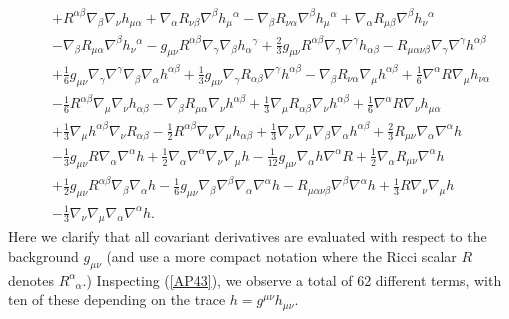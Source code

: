 \begin{eqnarray}
\nonumber\\
&&+ R^{\alpha \beta} \nabla_{\beta}\nabla_{\nu}h_{\mu \alpha} 
+ \nabla_{\alpha}R_{\nu \beta} \nabla^{\beta}h_{\mu}{}^{\alpha} 
-  \nabla_{\beta}R_{\nu \alpha} \nabla^{\beta}h_{\mu}{}^{\alpha} + \nabla_{\alpha}R_{\mu \beta} \nabla^{\beta}h_{\nu}{}^{\alpha} 
\nonumber\\
&&-  \nabla_{\beta}R_{\mu \alpha} \nabla^{\beta}h_{\nu}{}^{\alpha} -  g_{\mu \nu} R^{\alpha \beta} \nabla_{\gamma}\nabla_{\beta}h_{\alpha}{}^{\gamma} 
+ \tfrac{2}{3} g_{\mu \nu} R^{\alpha \beta} \nabla_{\gamma}\nabla^{\gamma}h_{\alpha \beta} 
-  R_{\mu \alpha \nu \beta} \nabla_{\gamma}\nabla^{\gamma}h^{\alpha \beta} 
\nonumber\\
&&+ \tfrac{1}{6} g_{\mu \nu} \nabla_{\gamma}\nabla^{\gamma}\nabla_{\beta}\nabla_{\alpha}h^{\alpha \beta} + \tfrac{1}{3} g_{\mu \nu} \nabla_{\gamma}R_{\alpha \beta} \nabla^{\gamma}h^{\alpha \beta} -  \nabla_{\beta}R_{\nu \alpha} \nabla_{\mu}h^{\alpha \beta} 
+ \tfrac{1}{6} \nabla^{\alpha}R \nabla_{\mu}h_{\nu \alpha} 
\nonumber\\
&&
-  \tfrac{1}{6} R^{\alpha \beta} \nabla_{\mu}\nabla_{\nu}h_{\alpha \beta} -  \nabla_{\beta}R_{\mu \alpha} \nabla_{\nu}h^{\alpha \beta} + \tfrac{1}{3} \nabla_{\mu}R_{\alpha \beta} \nabla_{\nu}h^{\alpha \beta} + \tfrac{1}{6} \nabla^{\alpha}R \nabla_{\nu}h_{\mu \alpha} 
\nonumber\\
&&+ \tfrac{1}{3} \nabla_{\mu}h^{\alpha \beta} \nabla_{\nu}R_{\alpha \beta} 
-  \tfrac{1}{2} R^{\alpha \beta} \nabla_{\nu}\nabla_{\mu}h_{\alpha \beta} 
+ \tfrac{1}{3} \nabla_{\nu}\nabla_{\mu}\nabla_{\beta}\nabla_{\alpha}h^{\alpha \beta}
+\tfrac{2}{3} R_{\mu \nu} \nabla_{\alpha}\nabla^{\alpha}h 
\nonumber\\
&&-  \tfrac{1}{3} g_{\mu \nu} R \nabla_{\alpha}\nabla^{\alpha}h + \tfrac{1}{2} \nabla_{\alpha}\nabla^{\alpha}\nabla_{\nu}\nabla_{\mu}h 
-  \tfrac{1}{12} g_{\mu \nu} \nabla_{\alpha}h \nabla^{\alpha}R + \tfrac{1}{2} \nabla_{\alpha}R_{\mu \nu} \nabla^{\alpha}h 
\nonumber\\
&&
+ \tfrac{1}{2} g_{\mu \nu} R^{\alpha \beta} \nabla_{\beta}\nabla_{\alpha}h -  \tfrac{1}{6} g_{\mu \nu} \nabla_{\beta}\nabla^{\beta}\nabla_{\alpha}\nabla^{\alpha}h -  R_{\mu \alpha \nu \beta} \nabla^{\beta}\nabla^{\alpha}h + \tfrac{1}{3} R \nabla_{\nu}\nabla_{\mu}h 
\nonumber\\
&&-  \tfrac{1}{3} \nabla_{\nu}\nabla_{\mu}\nabla_{\alpha}\nabla^{\alpha}h.
\label{AP43}
\end{eqnarray}
%
Here we clarify that all covariant derivatives are evaluated with respect to the background $g_{\mu\nu}$ (and use a more compact notation where the Ricci scalar $R$ denotes $R^{\alpha}_{\phantom{\alpha}\alpha}$.) Inspecting (\ref{AP43}), we observe a total of 62 different terms, with ten of these depending on the trace $h=g^{\mu\nu}h_{\mu\nu}$. 

